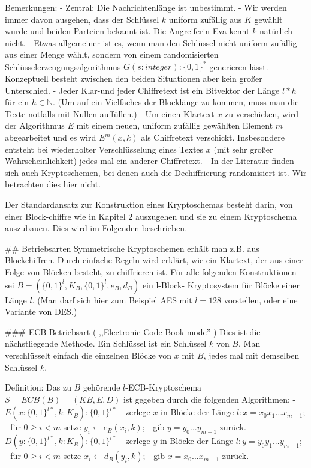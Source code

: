 \documentclass[a4paper]{article}
\begin{document}
\begin{multicols}{3}
Bemerkungen:
- Zentral: Die Nachrichtenlänge ist unbestimmt.
- Wir werden immer davon ausgehen, dass der Schlüssel $k$ uniform zufällig aus $K$ gewählt wurde und beiden Parteien bekannt ist. Die Angreiferin Eva kennt $k$ natürlich nicht.
- Etwas allgemeiner ist es, wenn man den Schlüssel nicht uniform zufällig aus einer Menge wählt, sondern von einem randomisierten Schlüsselerzeugungsalgorithmus $G(s:integer):\{0,1\}^*$ generieren lässt. Konzeptuell besteht zwischen den beiden Situationen aber kein großer Unterschied.
- Jeder Klar-und jeder Chiffretext ist ein Bitvektor der Länge $l*h$ für ein $h\in\mathbb{N}$. (Um auf ein Vielfaches der Blocklänge zu kommen, muss man die Texte notfalls mit Nullen auffüllen.)
- Um einen Klartext $x$ zu verschicken, wird der Algorithmus $E$ mit einem neuen, uniform zufällig gewählten Element $m$ abgearbeitet und es wird $E^m(x,k)$ als Chiffretext verschickt. Insbesondere entsteht bei wiederholter Verschlüsselung eines Textes $x$ (mit sehr großer Wahrscheinlichkeit) jedes mal ein anderer Chiffretext.
- In der Literatur finden sich auch Kryptoschemen, bei denen auch die Dechiffrierung randomisiert ist. Wir betrachten dies hier nicht.

Der Standardansatz zur Konstruktion eines Kryptoschemas besteht darin, von einer Block-chiffre wie in Kapitel 2 auszugehen und sie zu einem Kryptoschema auszubauen. Dies wird im Folgenden beschrieben.

## Betriebsarten
Symmetrische Kryptoschemen erhält man z.B. aus Blockchiffren. Durch einfache Regeln wird erklärt, wie ein Klartext, der aus einer Folge von Blöcken besteht, zu chiffrieren ist. Für alle folgenden Konstruktionen sei $B=(\{0,1\}^l,K_B,\{0,1\}^l,e_B,d_B)$ ein l-Block-
Kryptosystem für Blöcke einer Länge $l$. (Man darf sich hier zum Beispiel AES mit $l=128$ vorstellen, oder eine Variante von DES.)

### ECB-Betriebsart ( ,,Electronic Code Book mode'' )
Dies ist die nächstliegende Methode. Ein Schlüssel ist ein Schlüssel $k$ von $B$. Man verschlüsselt einfach die einzelnen Blöcke von $x$ mit $B$, jedes mal mit demselben Schlüssel $k$.

Definition: Das zu $B$ gehörende $l$-ECB-Kryptoschema $S=ECB(B)=(KB,E,D)$ ist gegeben durch die folgenden Algorithmen:
- $E(x:\{0,1\}^{l*},k:K_B) :\{0,1\}^{l*}$
    - zerlege $x$ in Blöcke der Länge $l:x=x_0 x_1 ...x_{m-1}$;
    - für $0\geq i < m$ setze $y_i\leftarrow e_B(x_i,k)$;
    - gib $y=y_0 ...y_{m-1}$ zurück.
- $D(y:\{0,1\}^{l*},k:K_B) :\{0,1\}^{l*}$
    - zerlege $y$ in Blöcke der Länge $l:y=y_0 y_1 ...y_{m-1}$;
    - für $0\geq i < m$ setze $x_i\leftarrow d_B(y_i,k)$;
    - gib $x=x_0 ...x_{m-1}$ zurück.


\end{multicols}
\end{document}
